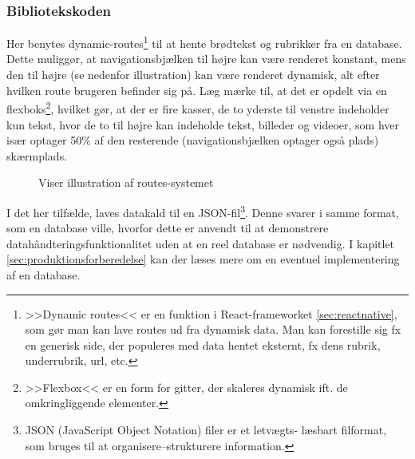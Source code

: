 \subsubsection{Bibliotekskoden}
Her benytes dynamic-routes\footnote{>>Dynamic routes<< er en funktion i React-frameworket \ref{sec:reactnative}, som gør man kan lave routes ud fra dynamisk data. Man kan forestille sig fx en generisk side, der populeres med data hentet eksternt, fx dens rubrik, underrubrik, url, etc.} til at hente brødtekst og rubrikker fra en database. Dette muliggør, at navigationsbjælken til højre kan være renderet konstant, mens den til højre (se nedenfor illustration) kan være renderet dynamisk, alt efter hvilken route brugeren befinder sig på. Læg mærke til, at det er opdelt via en flexboks\footnote{>>Flexbox<< er en form for gitter, der skaleres dynamisk ift. de omkringliggende elementer.}, hvilket gør, at der er fire kasser, de to yderste til venstre indeholder kun tekst, hvor de to til højre kan indeholde tekst, billeder og videoer, som hver især optager 50\% af den resterende (navigationsbjælken optager også plads) skærmplads.

\begin{figure}[H]
    \centering
    \caption{Viser illustration af routes-systemet}
    \label{fig:routes}
\end{figure}

I det her tilfælde, laves datakald til en JSON-fil\footnote{JSON (JavaScript Object Notation) filer er et letvægts- læsbart filformat, som bruges til at organisere--strukturere information.}. Denne svarer i samme format, som en database ville, hvorfor dette er anvendt til at demonstrere datahåndteringsfunktionalitet uden at en reel database er nødvendig. I kapitlet \ref{sec:produktionsforberedelse} kan der læses mere om en eventuel implementering af en database.

